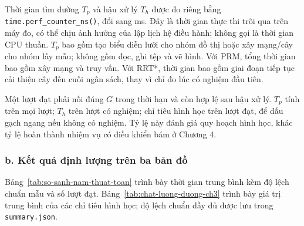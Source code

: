 \documentclass[12pt,a4paper,oneside]{report}
\begin{document}
Thời gian tìm đường \(T_p\) và hậu xử lý \(T_h\) được đo riêng bằng \texttt{time.perf\_counter\_ns()}, đổi sang ms. Đây là thời gian thực thi trôi qua trên máy đo, có thể chịu ảnh hưởng của lập lịch hệ điều hành; không gọi là thời gian CPU thuần. \(T_p\) bao gồm tạo biểu diễn lưới cho nhóm đồ thị hoặc xây mạng/cây cho nhóm lấy mẫu; không gồm đọc, ghi tệp và vẽ hình. Với PRM, tổng thời gian bao gồm xây mạng và truy vấn. Với RRT*, thời gian bao gồm giai đoạn tiếp tục cải thiện cây đến cuối ngân sách, thay vì chỉ đo lúc có nghiệm đầu tiên.

Một lượt đạt phải nối đúng \(G\) trong thời hạn và còn hợp lệ sau hậu xử lý. \(T_p\) tính trên mọi lượt; \(T_h\) trên lượt có nghiệm; chỉ tiêu hình học trên lượt đạt, để dấu gạch ngang nếu không có nghiệm. Tỷ lệ này đánh giá quy hoạch hình học, khác tỷ lệ hoàn thành nhiệm vụ có điều khiển bám ở Chương 4.

\clearpage
\subsubsection*{b. Kết quả định lượng trên ba bản đồ}

Bảng~\ref{tab:so-sanh-nam-thuat-toan} trình bày thời gian trung bình kèm độ lệch chuẩn mẫu và số lượt đạt. Bảng~\ref{tab:chat-luong-duong-ch3} trình bày giá trị trung bình của các chỉ tiêu hình học; độ lệch chuẩn đầy đủ được lưu trong \texttt{summary.json}.
\end{document}

